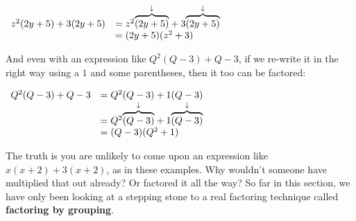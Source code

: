 \documentclass{ximera}
\begin{document}
\begin{center}
$\begin{array}{rl}
  z^2(2y+5)+3(2y+5)&=z^2\mathord{\overset{\downarrow}{\overbrace{(2y+5)}}}+3\mathord{\overset{\downarrow}{\overbrace{(2y+5)}}}\\
        &=(2y+5)(z^2+3)
\end{array}
$
\end{center}
      And even with an expression like $Q^2(Q-3)+Q-3$,
      if we re-write it in the right way using a $1$ and some parentheses,
      then it too can be factored:
\begin{center}
$\begin{array}{rl}
  Q^2(Q-3)+Q-3&=Q^2(Q-3)+1(Q-3)\\
        &=Q^2\mathord{\overset{\downarrow}{\overbrace{(Q-3)}}}+1\mathord{\overset{\downarrow}{\overbrace{(Q-3)}}}\\
        &=(Q-3)(Q^2+1)
\end{array}
$
\end{center}

 The truth is you are unlikely to come upon an expression like
      $x(x+2)+3(x+2)$, as in these examples.
      Why wouldn't someone have multiplied that out already?
      Or factored it all the way?
      So far in this section,
      we have only been looking at a stepping stone to a real factoring technique called
      \textbf{factoring by grouping}.
\end{document}
